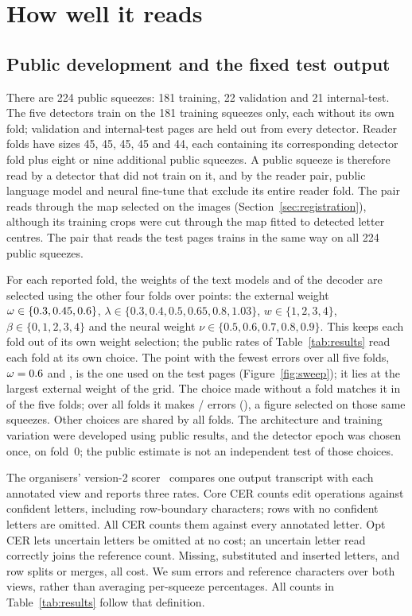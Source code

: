 \documentclass[11pt]{article}
\begin{document}
\section{How well it reads}
\label{sec:results}
\subsection{Public development and the fixed test output}
There are 224 public squeezes: 181 training, 22 validation and 21 internal-test. The five detectors train
on the 181 training squeezes only, each without its own fold; validation and internal-test pages are held
out from every detector. Reader folds have sizes 45, 45, 45, 45 and 44, each containing its corresponding
detector fold plus eight or nine additional public squeezes. A public squeeze is therefore read by a
detector that did not train on it, and by the reader pair, public language model and neural fine-tune that
exclude its entire reader fold. The pair reads through the map selected on the images
(Section~\ref{sec:registration}), although its training crops were cut through the map fitted to detected
letter centres. The pair that reads the test pages trains in the same way on all 224 public squeezes.

For each reported fold, the weights of the text models and of the decoder are selected using the other
four folds over \DevGridPoints{} points: the external weight $\omega\in\{0.3, 0.45, 0.6{}\}$,
$\lambda\in\{0.3,0.4,0.5,0.65,0.8,1.03\}$, $w\in\{1,2,3,4\}$, $\beta\in\{0,1,2,3,4\}$ and the neural
weight $\nu\in\{0.5,0.6,0.7,0.8,0.9\}$. This keeps each fold out of its own weight selection; the public
rates of Table~\ref{tab:results} read each fold at its own choice. The point with the fewest errors over
all five folds, $\omega=0.6{}$ and \DevCombo{}, is the one used on the test pages
(Figure~\ref{fig:sweep}); it lies at the largest external weight of the grid.
The choice made without a fold matches it in \DevNestedAgree{} of the five folds; over all folds it makes
\DevOofErrors{}/\DevOofChars{} errors (\DevOofCer{}), a figure selected on those same squeezes.
Other choices are shared by all folds. The architecture and training variation were developed using
public results, and the detector epoch was chosen once, on fold~0; the public estimate is not an
independent test of those choices.

The organisers' version-2 scorer~\cite{trogs26data} compares one output transcript with each annotated
view and reports three rates. Core CER counts edit operations against confident letters, including
row-boundary characters; rows with no confident letters are omitted. All CER counts them against every
annotated letter. Opt CER lets uncertain letters be omitted at no cost; an uncertain letter read correctly
joins the reference count. Missing, substituted and inserted letters, and row splits or merges, all cost.
We sum errors and reference characters over both views, rather than averaging per-squeeze percentages.
All counts in Table~\ref{tab:results} follow that definition.
\end{document}

